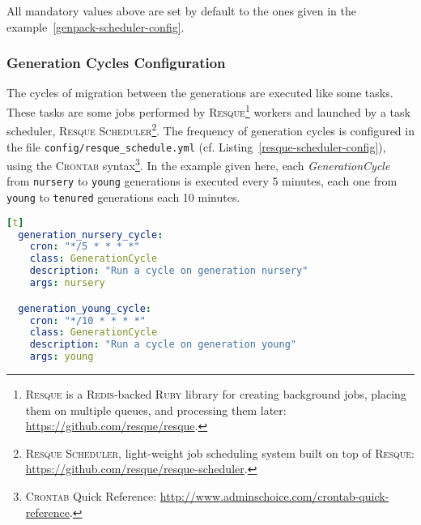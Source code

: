 All mandatory values above are set by default to the ones given in the example~\ref{genpack-scheduler-config}.

\subsubsection{Generation Cycles Configuration}

The cycles of migration between the generations are executed like some tasks.
These tasks are some jobs performed by \textsc{Resque}\footnote{\textsc{Resque} is a \textsc{Redis}-backed \textsc{Ruby} library for creating background jobs, placing them on multiple queues, and processing them later: \url{https://github.com/resque/resque}.} workers and launched by a task scheduler, \textsc{Resque Scheduler}\footnote{\textsc{Resque Scheduler}, light-weight job scheduling system built on top of \textsc{Resque}: \url{https://github.com/resque/resque-scheduler}.}.
The frequency of generation cycles is configured in the file \texttt{config/resque\_schedule.yml} (cf. Listing~\ref{resque-scheduler-config}), using the \textsc{Crontab} syntax\footnote{\textsc{Crontab} Quick Reference: \url{http://www.adminschoice.com/crontab-quick-reference}.}.
In the example given here, each \emph{GenerationCycle} from \texttt{nursery} to \texttt{young} generations is executed every 5 minutes, each one from \texttt{young} to \texttt{tenured} generations each 10 minutes.

\begin{minipage}{\linewidth} %
\begin{lstlisting}[language=YAML,caption={Configuration file for \textsc{Resque Scheduler}.},label=resque-scheduler-config][t]
  generation_nursery_cycle:
    cron: "*/5 * * * *"
    class: GenerationCycle
    description: "Run a cycle on generation nursery"
    args: nursery

  generation_young_cycle:
    cron: "*/10 * * * *"
    class: GenerationCycle
    description: "Run a cycle on generation young"
    args: young
\end{lstlisting}
\end{minipage}
